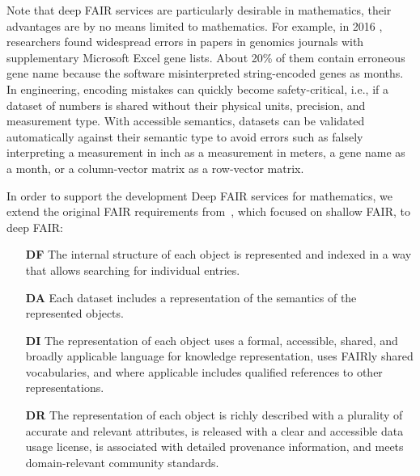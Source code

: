 Note that deep FAIR services are particularly desirable in mathematics, their advantages are by no means limited to mathematics.
For example, in 2016 \cite{ZieEreElO:GeneErrors16}, researchers found widespread errors in papers in genomics journals with supplementary Microsoft Excel gene lists. 
About 20\% of them contain erroneous gene name because the software misinterpreted string-encoded genes as months.
In engineering, encoding mistakes can quickly become safety-critical, i.e., if a dataset of numbers is shared without their physical units, precision, and measurement type.
With accessible semantics, datasets can be validated automatically against their semantic type to avoid errors such as falsely interpreting a measurement in inch as a measurement in meters, a gene name as a month, or a column-vector matrix as a row-vector matrix.


In order to support the development Deep FAIR services for mathematics, we extend the original FAIR requirements from~\cite{WilDumAal:FAIR16}, which focused on shallow FAIR, to deep FAIR:
\begin{enumerate}
  \item[\textbf{DF}] The internal structure of each object is represented and indexed in a way that allows searching for individual entries.
  \item[\textbf{DA}] Each dataset includes a representation of the semantics of the represented objects.
  \item[\textbf{DI}] The representation of each object uses a formal, accessible, shared, and broadly applicable language for knowledge representation, uses FAIRly shared vocabularies, and where applicable includes qualified references to other representations.
  \item[\textbf{DR}] The representation of each object is richly described with a plurality of accurate and relevant attributes, is released with a clear and accessible data usage license, is associated with detailed provenance information, and meets domain-relevant community standards.
\end{enumerate}



